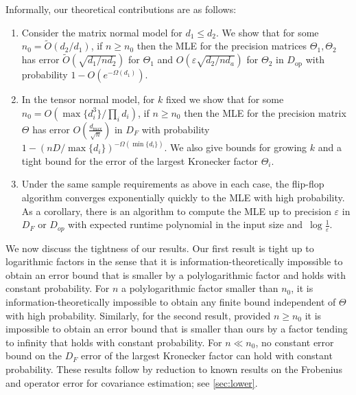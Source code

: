 \documentclass[aos]{imsart}
\theoremstyle{definition}
\numberwithin{equation}{section}
\DeclareMathOperator{\op}{op}
\newcommand{\eps}{\varepsilon}
\newcommand{\CF}[1]{{\color{purple}[CF: #1]}}
\newcommand{\MW}[1]{{\color{red}[MW: #1]}}
\begin{document}
Informally, our theoretical contributions are as follows:
\begin{enumerate}
\item Consider the matrix normal model for $d_1 \leq d_2$. We show that for some $n_0 =\widetilde{O}( d_2/d_1)$, if $n \geq n_0$ then the MLE for the precision matrices $\Theta_1, \Theta_2$ has error $\widetilde{O}(\sqrt{{d_1}/{nd_2}})$ for $\Theta_1$ and $O(\eps \sqrt{{d_2}/{nd_a}})$ for $\Theta_2$ in $D_{\op}$ with probability $1 - O(e^{ - \Omega ( d_1)})$.
\item In the tensor normal model, for $k$ fixed we show that for some $n_0 = O( \max\{d_i^3\}/ \prod_i d_i)$, if $n \geq n_0$ then the MLE for the precision matrix $\Theta$ has error $O( \frac{d_{\max}}{\sqrt{n}} )$ in $D_F$ with probability $1 - (n D /\max\{d_i\})^{-\Omega(\min\{d_i\})}$. We also give bounds for growing $k$ and a tight bound for the error of the largest Kronecker factor $\Theta_i$.
\item Under the same sample requirements as above in each case, the flip-flop algorithm converges exponentially quickly to the MLE with high probability.
As a corollary, there is an algorithm to compute the MLE up to precision $\eps$ in $D_F$ or $D_{op}$ with expected runtime polynomial in the input size and~$\log\frac1\eps$.
\end{enumerate}

We now discuss the tightness of our results. Our first result is tight up to logarithmic factors in the sense that it is information-theoretically impossible to obtain an error bound that is smaller by a polylogarithmic factor and holds with constant probability. For $n$ a polylogarithmic factor smaller than $n_0$, it is information-theoretically impossible to obtain any finite bound independent of $\Theta$ with high probability. Similarly, for the second result, provided $n \geq n_0$ it is impossible to obtain an error bound that is smaller than ours by a factor tending to infinity that holds with constant probability. For $n \ll n_0$, no constant error bound on the $D_F$ error of the largest Kronecker factor can hold with constant probability. These results follow by reduction to known results on the Frobenius and operator error for covariance estimation; see \cref{sec:lower}.
\end{document}
